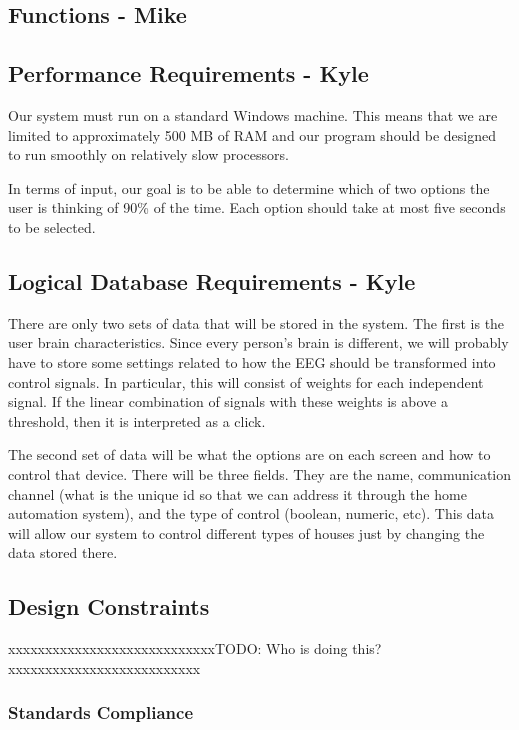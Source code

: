 \documentclass{article}
\begin{document}
\subsection{Functions - Mike}

\subsection{Performance Requirements - Kyle}
Our system must run on a standard Windows machine. This means that we are limited to approximately 500 MB of RAM and our program should be designed to run smoothly on relatively slow processors.

In terms of input, our goal is to be able to determine which of two options the user is thinking of 90\% of the time. Each option should take at most five seconds to be selected.

\subsection{Logical Database Requirements - Kyle}
There are only two sets of data that will be stored in the system. The first is the user brain characteristics. Since every person's brain is different, we will probably have to store some settings related to how the EEG should be transformed into control signals. In particular, this will consist of weights for each independent signal. If the linear combination of signals with these weights is above a threshold, then it is interpreted as a click.

The second set of data will be what the options are on each screen and how to control that device. There will be three fields. They are the name, communication channel (what is the unique id so that we can address it through the home automation system), and the type of control (boolean, numeric, etc). This data will allow our system to control different types of houses just by changing the data stored there.

\subsection{Design Constraints}
{\color{red}xxxxxxxxxxxxxxxxxxxxxxxxxxxxTODO: Who is doing this?xxxxxxxxxxxxxxxxxxxxxxxxxx}

\subsubsection{Standards Compliance}
\end{document}
